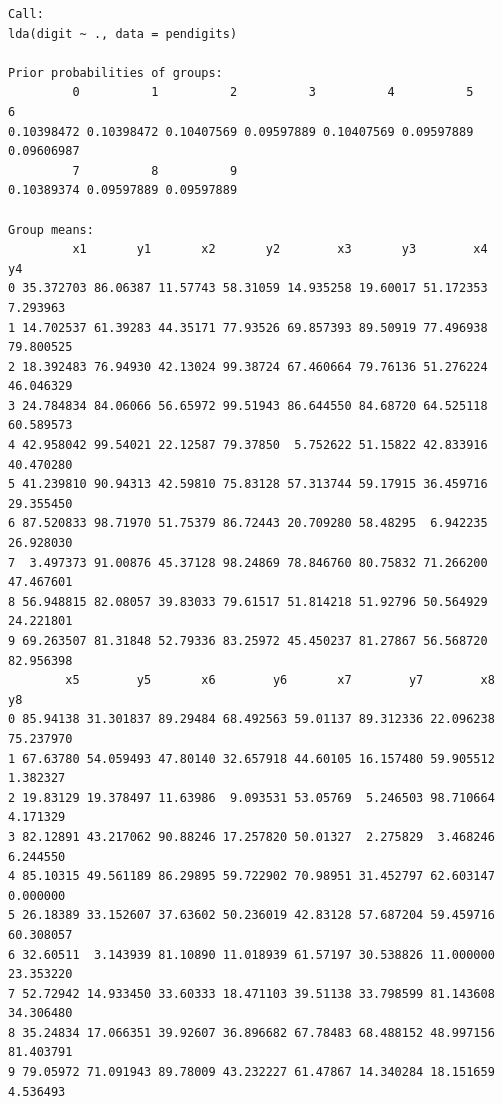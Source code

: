 \documentclass[
  letterpaper,
  DIV=11,
  numbers=noendperiod]{scrartcl}
\begin{document}
\begin{verbatim}
Call:
lda(digit ~ ., data = pendigits)

Prior probabilities of groups:
         0          1          2          3          4          5          6 
0.10398472 0.10398472 0.10407569 0.09597889 0.10407569 0.09597889 0.09606987 
         7          8          9 
0.10389374 0.09597889 0.09597889 

Group means:
         x1       y1       x2       y2        x3       y3        x4        y4
0 35.372703 86.06387 11.57743 58.31059 14.935258 19.60017 51.172353  7.293963
1 14.702537 61.39283 44.35171 77.93526 69.857393 89.50919 77.496938 79.800525
2 18.392483 76.94930 42.13024 99.38724 67.460664 79.76136 51.276224 46.046329
3 24.784834 84.06066 56.65972 99.51943 86.644550 84.68720 64.525118 60.589573
4 42.958042 99.54021 22.12587 79.37850  5.752622 51.15822 42.833916 40.470280
5 41.239810 90.94313 42.59810 75.83128 57.313744 59.17915 36.459716 29.355450
6 87.520833 98.71970 51.75379 86.72443 20.709280 58.48295  6.942235 26.928030
7  3.497373 91.00876 45.37128 98.24869 78.846760 80.75832 71.266200 47.467601
8 56.948815 82.08057 39.83033 79.61517 51.814218 51.92796 50.564929 24.221801
9 69.263507 81.31848 52.79336 83.25972 45.450237 81.27867 56.568720 82.956398
        x5        y5       x6        y6       x7        y7        x8        y8
0 85.94138 31.301837 89.29484 68.492563 59.01137 89.312336 22.096238 75.237970
1 67.63780 54.059493 47.80140 32.657918 44.60105 16.157480 59.905512  1.382327
2 19.83129 19.378497 11.63986  9.093531 53.05769  5.246503 98.710664  4.171329
3 82.12891 43.217062 90.88246 17.257820 50.01327  2.275829  3.468246  6.244550
4 85.10315 49.561189 86.29895 59.722902 70.98951 31.452797 62.603147  0.000000
5 26.18389 33.152607 37.63602 50.236019 42.83128 57.687204 59.459716 60.308057
6 32.60511  3.143939 81.10890 11.018939 61.57197 30.538826 11.000000 23.353220
7 52.72942 14.933450 33.60333 18.471103 39.51138 33.798599 81.143608 34.306480
8 35.24834 17.066351 39.92607 36.896682 67.78483 68.488152 48.997156 81.403791
9 79.05972 71.091943 89.78009 43.232227 61.47867 14.340284 18.151659  4.536493


\end{verbatim}
\end{document}
